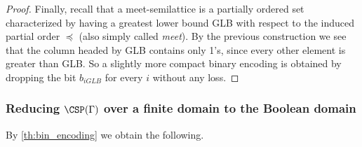 \documentclass[11pt]{article}
\newtheorem{corollary}[theorem]{Corollary}
\begin{document}
\begin{proof}
    Finally, recall that a meet-semilattice is a partially ordered set characterized by having a greatest lower bound GLB with respect to the induced partial order $\preceq$ (also simply called \textit{meet}). By the previous construction we see that the column headed by GLB contains only 1's, since every other element is greater than GLB. So a slightly more compact binary encoding is obtained by dropping the bit $b_{iGLB}$ for every $i$ without any loss.
\end{proof}


 
\subsubsection[Reducing CSP(Gamma) over a finite domain to the Boolean domain]{Reducing $\CSP(\Gamma)$ over a finite domain to the Boolean domain}\label{sect:mapping2bool}
By \cref{th:bin_encoding} we obtain the following.%
\end{document}
